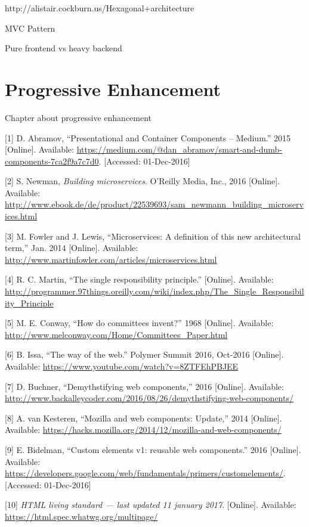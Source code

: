 \documentclass[]{assets/latex/ieee}
\begin{document}
http://alistair.cockburn.us/Hexagonal+architecture

MVC Pattern

Pure frontend vs heavy backend

\section{Progressive Enhancement}\label{progressive-enhancement}

Chapter about progressive enhancement

\hypertarget{refs}{}
\hypertarget{ref-Abramov2015}{}
{[}1{]} D. Abramov, ``Presentational and Container Components --
Medium.'' 2015 {[}Online{]}. Available:
\url{https://medium.com/@dan_abramov/smart-and-dumb-components-7ca2f9a7c7d0}.
{[}Accessed: 01-Dec-2016{]}

\hypertarget{ref-Newman2015}{}
{[}2{]} S. Newman, \emph{Building microservices}. O'Reilly Media, Inc.,
2016 {[}Online{]}. Available:
\url{http://www.ebook.de/de/product/22539693/sam_newmann_building_microservices.html}

\hypertarget{ref-Fowler2014}{}
{[}3{]} M. Fowler and J. Lewis, ``Microservices: A definition of this
new architectural term,'' Jan. 2014 {[}Online{]}. Available:
\url{http://www.martinfowler.com/articles/microservices.html}

\hypertarget{ref-Martin}{}
{[}4{]} R. C. Martin, ``The single responsibility principle.''
{[}Online{]}. Available:
\url{http://programmer.97things.oreilly.com/wiki/index.php/The_Single_Responsibility_Principle}

\hypertarget{ref-Conway1968}{}
{[}5{]} M. E. Conway, ``How do committees invent?'' 1968 {[}Online{]}.
Available: \url{http://www.melconway.com/Home/Committees_Paper.html}

\hypertarget{ref-Issa2016}{}
{[}6{]} B. Issa, ``The way of the web.'' Polymer Summit 2016, Oct-2016
{[}Online{]}. Available:
\url{https://www.youtube.com/watch?v=8ZTFEhPBJEE}

\hypertarget{ref-Buchner2016}{}
{[}7{]} D. Buchner, ``Demythstifying web components,'' 2016
{[}Online{]}. Available:
\url{http://www.backalleycoder.com/2016/08/26/demythstifying-web-components/}

\hypertarget{ref-vanKesteren2014}{}
{[}8{]} A. van Kesteren, ``Mozilla and web components: Update,'' 2014
{[}Online{]}. Available:
\url{https://hacks.mozilla.org/2014/12/mozilla-and-web-components/}

\hypertarget{ref-Bidelman2016}{}
{[}9{]} E. Bidelman, ``Custom elements v1: reusable web components.''
2016 {[}Online{]}. Available:
\url{https://developers.google.com/web/fundamentals/primers/customelements/}.
{[}Accessed: 01-Dec-2016{]}

\hypertarget{ref-HTML}{}
{[}10{]} \emph{HTML living standard --- last updated 11 january 2017}.
{[}Online{]}. Available: \url{https://html.spec.whatwg.org/multipage/}
\end{document}
